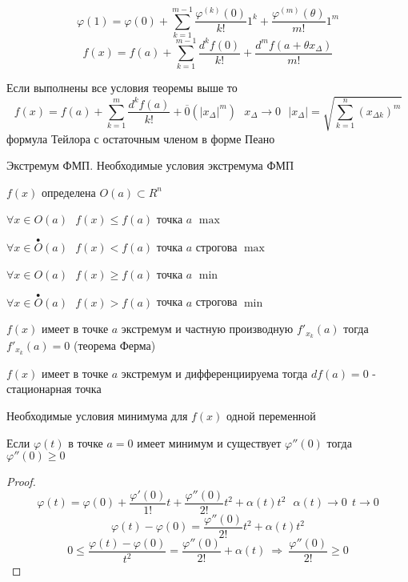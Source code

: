 \begin{block}
  $$
  \varphi(1) = \varphi(0) + \sum_{k=1}^{m-1} \frac{\varphi^{(k)}(0)}{k!} 1^k +
  \frac{\varphi^{(m)}(\theta)}{m!} 1^m
  $$
  $$
  f(x) = f(a) + \sum_{k=1}^{m-1} \frac{d^k f(0)}{k!} +
  \frac{d^m f(a + \theta x_{\Delta})}{m!}
  $$
\end{block}

\begin{block}[Следствие]
  Если выполнены все условия теоремы выше то
  $$
  f(x) = f(a) + \sum_{k=1}^m \frac{d^k f(a)}{k!} + \overline{0}(|x_{\Delta}|^m)
  ~~~ x_{\Delta} \to 0 ~~~ |x_{\Delta}| = \sqrt{\sum_{k=1}^n (x_{\Delta k})^m}
  $$
  формула Тейлора с остаточным членом в форме Пеано
\end{block}

\begin{title}[\Large]
  Экстремум ФМП. Необходимые условия экстремума ФМП
\end{title}

\begin{define}
  $f(x)$ определена $O(a) \subset R^n$

  $\forall x \in O(a) ~~~ f(x) \le f(a)$ точка $a$ $\max$

  $\forall x \in \stackrel{\bullet}{O}(a) ~~~ f(x) < f(a)$ точка $a$
  строгова $\max$

  $\forall x \in O(a) ~~~ f(x) \ge f(a)$ точка $a$ $\min$

  $\forall x \in \stackrel{\bullet}{O}(a) ~~~ f(x) > f(a)$ точка $a$
  строгова $\min$
\end{define}

\begin{theorem}
  $f(x)$ имеет в точке $a$ экстремум и частную производную $f'_{x_k}(a)$ тогда
  $f'_{x_k}(a) = 0$ (теорема Ферма)
\end{theorem}

\begin{block}[Следствие]
  $f(x)$ имеет в точке $a$ экстремум и дифференциируема тогда $df(a) = 0$
  - стационарная точка
\end{block}

\begin{block}[Лемма]
  Необходимые условия минимума для $f(x)$ одной переменной

  Если $\varphi(t)$ в точке $a=0$ имеет минимум и существует $\varphi''(0)$
  тогда $\varphi''(0) \ge 0$
\end{block}

\begin{proof}
  $$
  \varphi(t) = \varphi(0) + \frac{\varphi'(0)}{1!}t +
  \frac{\varphi''(0)}{2!}t^2 + \alpha(t)t^2 ~~~ \alpha(t) \to 0 ~~ t \to 0
  $$
  $$
  \varphi(t) - \varphi(0) = \frac{\varphi''(0)}{2!}t^2 + \alpha(t)t^2
  $$
  $$
  0 \le \frac{\varphi(t) - \varphi(0)}{t^2} = \frac{\varphi''(0)}{2!} +
  \alpha(t) ~ \Rightarrow ~ \frac{\varphi''(0)}{2!} \ge 0
  $$
\end{proof}

